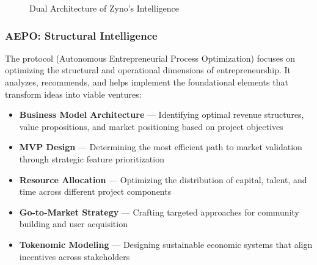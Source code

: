 \begin{figure}[H]
\caption{Dual Architecture of Zyno's Intelligence}
\label{fig:zyno-dual-intelligence}
\end{figure}

\subsubsection*{AEPO: Structural Intelligence}

The  protocol (Autonomous Entrepreneurial Process Optimization) focuses on optimizing the structural and operational dimensions of entrepreneurship. It analyzes, recommends, and helps implement the foundational elements that transform ideas into viable ventures:

\begin{itemize}
    \item \textbf{Business Model Architecture} — Identifying optimal revenue structures, value propositions, and market positioning based on project objectives
    
    \item \textbf{MVP Design} — Determining the most efficient path to market validation through strategic feature prioritization
    
    \item \textbf{Resource Allocation} — Optimizing the distribution of capital, talent, and time across different project components
    
    \item \textbf{Go-to-Market Strategy} — Crafting targeted approaches for community building and user acquisition
    
    \item \textbf{Tokenomic Modeling} — Designing sustainable economic systems that align incentives across stakeholders
\end{itemize}

